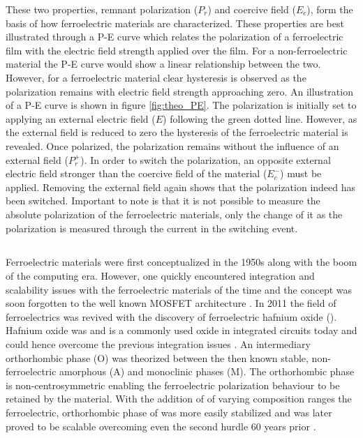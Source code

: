 \documentclass[11pt,twoside,final]{eitExjobb}  %
\begin{document}
These two properties, remnant polarization ($P_r$) and coercive field ($E_c$),
form the basis of how ferroelectric materials are characterized. These
properties are best illustrated through a P-E curve which relates the
polarization of a ferroelectric film with the electric field strength applied
over the film. For a non-ferroelectric material the P-E curve would show a
linear relationship between the two. However, for a ferroelectric material clear
hysteresis is observed as the polarization remains with electric field
strength approaching zero. An illustration of a P-E curve is shown in figure
\ref{fig:theo_PE}. The polarization is initially set to applying an external
electric field ($E$) following the green dotted line. However, as the external
field is reduced to zero the hysteresis of the ferroelectric material is
revealed. Once polarized, the polarization remains without the influence of an
external field ($P_r^+$). In order to switch the polarization, an opposite
external electric field stronger than the coercive field of the
material ($E_c^-$) must be applied. Removing the external field again shows
that the polarization indeed has been switched. Important to note is that it is
not possible to measure the absolute polarization of the ferroelectric
materials, only the change of it as the polarization is measured through the
current in the switching event.

\subsection{}

Ferroelectric materials were first conceptualized in the 1950s along with the
boom of the computing era. However, one quickly encountered integration and
scalability issues with the ferroelectric materials of the time and the concept
was soon forgotten to the well known MOSFET architecture
\cite{mikolajick2020past}. In 2011 the field of ferroelectrics was revived with
the discovery of ferroelectric hafnium oxide (). Hafnium oxide was and
is a commonly used oxide in integrated circuits today and could hence overcome
the previous integration issues \cite{boscke2011ferroelectricity}. An intermediary
orthorhombic phase (O) was theorized between the then known stable,
non-ferroelectric amorphous (A) and monoclinic phases (M). The orthorhombic
phase is non-centrosymmetric enabling the ferroelectric polarization behaviour
to be retained by the material. With the addition of  of varying
composition ranges the ferroelectric, orthorhombic phase of  was more
easily stabilized and was later proved to be scalable overcoming even the
second hurdle 60 years prior \cite{muller2012ferroelectricity, cheema2020one}.
\end{document}
